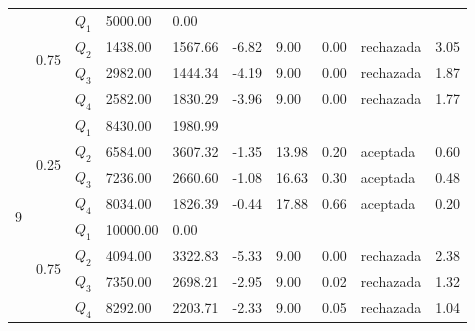 \begin{table}[]
\begin{tabular}{|l|l|l|l|l|l|l|l|l|l|}
 & \multirow{4}{*}{0.75} & $Q_1$ & 5000.00 & 0.00 & \multicolumn{5}{l|}{} \\ \cline{3-10} 
 &  & $Q_2$ & 1438.00 & 1567.66 & -6.82 & 9.00 & 0.00 & rechazada & 3.05 \\ \cline{3-10} 
 &  & $Q_3$ & 2982.00 & 1444.34 & -4.19 & 9.00 & 0.00 & rechazada & 1.87 \\ \cline{3-10} 
 &  & $Q_4$ & 2582.00 & 1830.29 & -3.96 & 9.00 & 0.00 & rechazada & 1.77 \\ \hline
\multirow{8}{*}{9} & \multirow{4}{*}{0.25} & $Q_1$ & 8430.00 & 1980.99 & \multicolumn{5}{l|}{} \\ \cline{3-10} 
 &  & $Q_2$ & 6584.00 & 3607.32 & -1.35 & 13.98 & 0.20 & aceptada & 0.60 \\ \cline{3-10} 
 &  & $Q_3$ & 7236.00 & 2660.60 & -1.08 & 16.63 & 0.30 & aceptada & 0.48 \\ \cline{3-10} 
 &  & $Q_4$ & 8034.00 & 1826.39 & -0.44 & 17.88 & 0.66 & aceptada & 0.20 \\ \cline{2-10} 
 & \multirow{4}{*}{0.75} & $Q_1$ & 10000.00 & 0.00 & \multicolumn{5}{l|}{} \\ \cline{3-10} 
 &  & $Q_2$ & 4094.00 & 3322.83 & -5.33 & 9.00 & 0.00 & rechazada & 2.38 \\ \cline{3-10} 
 &  & $Q_3$ & 7350.00 & 2698.21 & -2.95 & 9.00 & 0.02 & rechazada & 1.32 \\ \cline{3-10} 
 &  & $Q_4$ & 8292.00 & 2203.71 & -2.33 & 9.00 & 0.05 & rechazada & 1.04 \\ \hline
\end{tabular}
\end{table}


